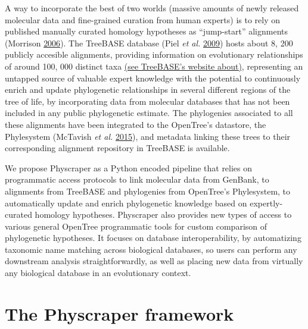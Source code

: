 \documentclass[]{article}
\begin{document}
A way to incorporate the best of two worlds (massive amounts of newly released molecular data and fine-grained curation from human experts) is to rely on published manually curated homology hypotheses as ``jump-start'' alignments (Morrison \protect\hyperlink{ref-morrison2006multiple}{2006}). The TreeBASE database (Piel \emph{et al.} \protect\hyperlink{ref-piel2009treebase}{2009}) hosts about 8, 200 publicly accesible alignments, providing information on evolutionary relationships of around 100, 000 distinct taxa \href{https://www.treebase.org/treebase-web/home.html\#:~:text=TreeBASE\%20is\%20produced\%20and\%20governed,mapped\%20to\%20104\%2C593\%20distinct\%20taxa.}{(see TreeBASE's website about)}, representing an untapped source of valuable expert knowledge with the potential to continuously enrich and update phylogenetic relationships in several different regions of the tree of life, by incorporating data from molecular databases that has not been included in any public phylogenetic estimate. The phylogenies associated to all these alignments have been integrated to the OpenTree's datastore, the Phylesystem (McTavish \emph{et al.} \protect\hyperlink{ref-mctavish2015phylesystem}{2015}), and metadata linking these trees to their corresponding alignment repository in TreeBASE is available.

We propose Physcraper as a Python encoded pipeline that relies on programmatic access protocols to link molecular data from GenBank, to alignments from TreeBASE and phylogenies from OpenTree's Phylesystem, to automatically update and enrich phylogenetic knowledge based on expertly-curated homology hypotheses. Physcraper also provides new types of access to various general OpenTree programmatic tools for custom comparison of phylogenetic hypotheses.
It focuses on database interoperability, by automatizing taxonomic name matching across biological databases, so users can perform any downstream analysis straightforwardly, as well as placing new data from virtually any biological database in an evolutionary context.

\hypertarget{the-physcraper-framework}{%
\section{The Physcraper framework}\label{the-physcraper-framework}}
\end{document}
